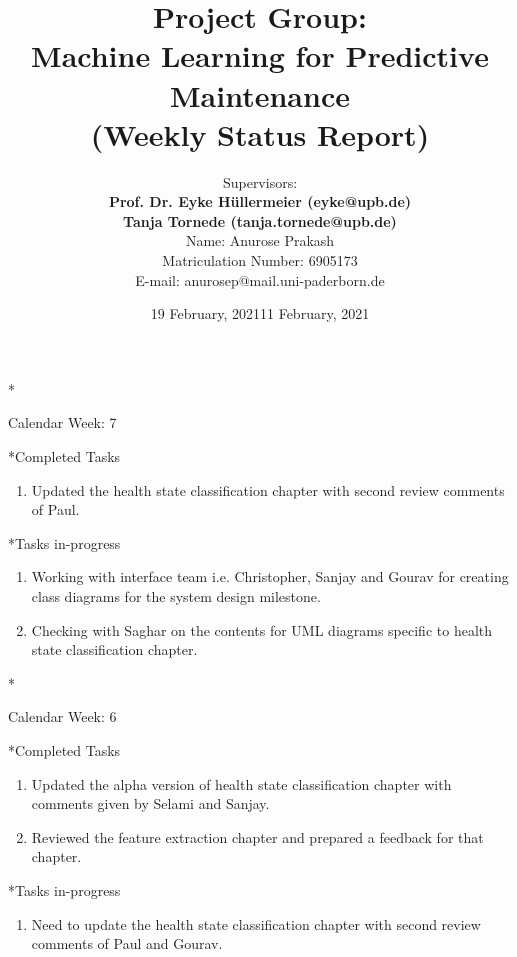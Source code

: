 \documentclass[11pt,a4paper]{article}
\title{Project Group:\\
\textbf{Machine Learning for Predictive Maintenance}\\
(Weekly Status Report)}
\author{Supervisors:\\
\textbf{Prof. Dr. Eyke H{\"u}llermeier (eyke@upb.de)}\\
\textbf{Tanja Tornede (tanja.tornede@upb.de)}\\ 
\vspace{10mm}
Name: Anurose Prakash \\
Matriculation Number: 6905173\\
E-mail: anurosep@mail.uni-paderborn.de
}
\date{}
\begin{document}
\maketitle
\thispagestyle{empty}

\clearpage
{}

\newpage
\begin{section}*{Calendar Week: 7 \hfill \date{19 February, 2021}}
    \begin{subsection}*{Completed Tasks}
        \begin{enumerate}
            \item 
            Updated the health state classification chapter with second review comments of Paul.            
        \end{enumerate}
    \end{subsection}
    
    \begin{subsection}*{Tasks in-progress}
        \begin{enumerate}
            \item
                Working with interface team i.e. Christopher, Sanjay and Gourav for creating class diagrams for the system design milestone.
            \item 
                Checking with Saghar on the contents for UML diagrams specific to health state classification chapter. 
        \end{enumerate}
    \end{subsection}
\end{section}

\newpage
\begin{section}*{Calendar Week: 6 \hfill \date{11 February, 2021}}
    \begin{subsection}*{Completed Tasks}
        \begin{enumerate}
            \item 
                Updated the alpha version of health state classification chapter with comments given by Selami and Sanjay.
            \item
                Reviewed the feature extraction chapter and prepared a feedback for that chapter.
        \end{enumerate}
    \end{subsection}
    
    \begin{subsection}*{Tasks in-progress}
        \begin{enumerate}
            \item
                Need to update the health state classification chapter with second review comments of Paul and Gourav.
        \end{enumerate}
    \end{subsection}
\end{section}
\end{document}
